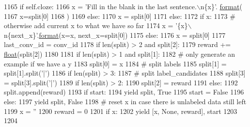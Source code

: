 \begin{DoxyCode}
1165                     \textcolor{keywordflow}{if} self.cloze:
1166                         x = \textcolor{stringliteral}{'Fill in the blank in the last sentence.\(\backslash\)n\{x\}'}.
      \hyperlink{namespaceparlai_1_1chat__service_1_1services_1_1messenger_1_1shared__utils_a32e2e2022b824fbaf80c747160b52a76}{format}(
1167                             x=split[0]
1168                         )
1169                     \textcolor{keywordflow}{else}:
1170                         x = split[0]
1171                 \textcolor{keywordflow}{else}:
1172                     \textcolor{keywordflow}{if} x:
1173                         \textcolor{comment}{# otherwise add current x to what we have so far}
1174                         x = \textcolor{stringliteral}{'\{x\}\(\backslash\)n\{next\_x\}'}.\hyperlink{namespaceparlai_1_1chat__service_1_1services_1_1messenger_1_1shared__utils_a32e2e2022b824fbaf80c747160b52a76}{format}(x=x, next\_x=split[0])
1175                     \textcolor{keywordflow}{else}:
1176                         x = split[0]
1177                 last\_conv\_id = conv\_id
1178                 \textcolor{keywordflow}{if} len(split) > 2 \textcolor{keywordflow}{and} split[2]:
1179                     reward += \hyperlink{namespaceprojects_1_1controllable__dialogue_1_1make__control__dataset_aa2b7207688c641dbc094ab44eca27113}{float}(split[2])
1180 
1181                 \textcolor{keywordflow}{if} len(split) > 1 \textcolor{keywordflow}{and} split[1]:
1182                     \textcolor{comment}{# only generate an example if we have a y}
1183                     split[0] = x
1184                     \textcolor{comment}{# split labels}
1185                     split[1] = split[1].split(\textcolor{stringliteral}{'|'})
1186                     \textcolor{keywordflow}{if} len(split) > 3:
1187                         \textcolor{comment}{# split label\_candidates}
1188                         split[3] = split[3].split(\textcolor{stringliteral}{'|'})
1189                     \textcolor{keywordflow}{if} len(split) > 2:
1190                         split[2] = reward
1191                     \textcolor{keywordflow}{else}:
1192                         split.append(reward)
1193                     \textcolor{keywordflow}{if} start:
1194                         \textcolor{keywordflow}{yield} split, \textcolor{keyword}{True}
1195                         start = \textcolor{keyword}{False}
1196                     \textcolor{keywordflow}{else}:
1197                         \textcolor{keywordflow}{yield} split, \textcolor{keyword}{False}
1198                     \textcolor{comment}{# reset x in case there is unlabeled data still left}
1199                     x = \textcolor{stringliteral}{''}
1200                     reward = 0
1201             \textcolor{keywordflow}{if} x:
1202                 \textcolor{keywordflow}{yield} [x, \textcolor{keywordtype}{None}, reward], start
1203 
1204 
\end{DoxyCode}
